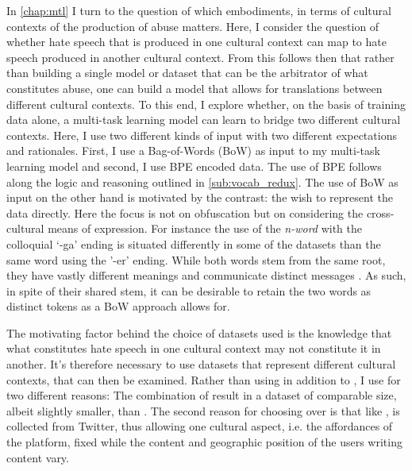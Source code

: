 {\color{green!80!black}
In \autoref{chap:mtl} I turn to the question of which embodiments, in terms of cultural contexts of the production of abuse matters. Here, I consider the question of whether hate speech that is produced in one cultural context can map to hate speech produced in another cultural context. From this follows then that rather than building a single model or dataset that can be the arbitrator of what constitutes abuse, one can build a model that allows for translations between different cultural contexts. To this end, I explore whether, on the basis of training data alone, a multi-task learning model can learn to bridge two different cultural contexts. Here, I use two different kinds of input with two different expectations and rationales.
First, I use a Bag-of-Words (BoW) as input to my multi-task learning model and second, I use BPE encoded data. The use of BPE follows along the logic and reasoning outlined in \autoref{sub:vocab_redux}. The use of BoW as input on the other hand is motivated by the contrast: the wish to represent the data directly. Here the focus is not on obfuscation but on considering the cross-cultural means of expression. For instance the use of the \textit{n-word} with the colloquial `-ga' ending is situated differently in some of the datasets than the same word using the '-er' ending. While both words stem from the same root, they have vastly different meanings and communicate distinct messages \citep{Rahman:2012}. As such, in spite of their shared stem, it can be desirable to retain the two words as distinct tokens as a BoW approach allows for.

The motivating factor behind the choice of datasets used is the knowledge that what constitutes hate speech in one cultural context may not constitute it in another. It's therefore necessary to use datasets that represent different cultural contexts, that can then be examined. Rather than using \citet{Wulczyn:2017} in addition to \citet{Davidson:2017}, I use \citet{Waseem:2016,Waseem-Hovy:2016} for two different reasons: The combination of \citet{Waseem:2016,Waseem-Hovy:2016} result in a dataset of comparable size, albeit slightly smaller, than \citet{Davidson:2017}. The second reason for choosing \citet{Waseem:2016,Waseem-Hovy:2016} over \citet{Wulczyn:2017} is that like \citet{Davidson:2017}, \citet{Waseem:2016,Waseem-Hovy:2016} is collected from Twitter, thus allowing one cultural aspect, i.e. the affordances of the platform, fixed while the content and geographic position of the users writing content vary.


}
